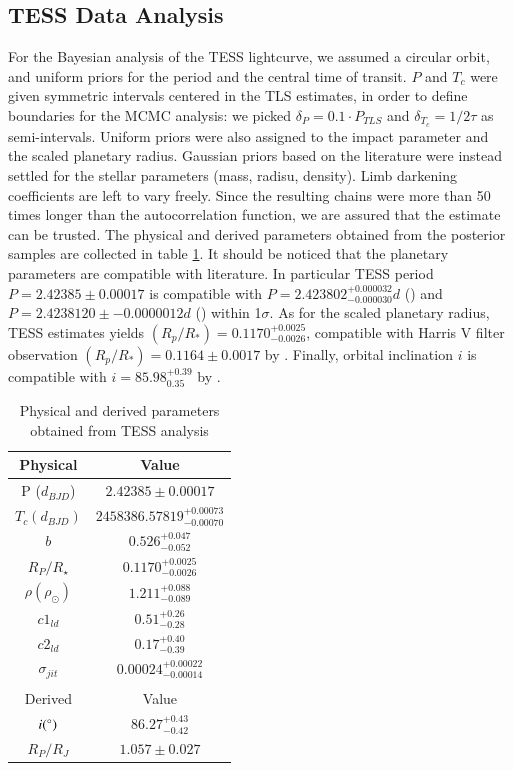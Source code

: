 \documentclass{aa}
\begin{document}
\subsection{TESS Data Analysis}
For the Bayesian analysis of the TESS lightcurve, we assumed a circular 
orbit, and uniform priors for the period and the central time of transit. $P$ and $T_c$ were given symmetric intervals centered in the TLS estimates, in order to define boundaries for the MCMC analysis: we picked $\delta_P=0.1\cdot P_{TLS}$ and $\delta_{T_c}=1/2\tau$ as semi-intervals. Uniform priors were also assigned to the impact parameter and the scaled planetary radius. Gaussian priors based on the literature were instead settled for the stellar parameters (mass, radisu, density). Limb darkening coefficients are left to vary freely. Since the resulting chains were more than 50 times longer than the 
autocorrelation function, we are assured that the estimate can be trusted.
The physical and derived parameters obtained from the posterior samples are collected in table \ref{table:1}. It should be noticed that the planetary parameters are compatible with literature. In particular TESS period $P=2.42385\pm0.00017$ is compatible with  $P=2.423802^{+0.000032}_{-0.000030} d$ (\cite{Addison}) and $P=2.4238120\pm-0.0000012 d$ (\cite{Turner}) within 1$\sigma$. As for the scaled planetary radius, TESS estimates yields $(R_p/R_{*}) = 0.1170_{-0.0026}^{+0.0025}$, compatible with Harris V filter observation $(R_p/R_{*})=0.1164\pm0.0017$ by \cite{Turner}. Finally, orbital inclination $i$ is compatible with $i=85.98_{0.35}^{+0.39}$ by \cite{Addison}.
 \begin{table}[h!]
 \small
 \centering
    \begin{tabular}{cc}
    \hline
    Physical & Value \\
    \hline
    P ($d_{BJD}$)   &  $2.42385\pm0.00017$ \\
    $T_{c} (d_{BJD})$ &  $2458386.57819 _{-0.00070}^{+0.00073}$ \\ 
    $b$ & $0.526_{-0.052}^{+0.047}$ \\
    $R_{P }/ R_{\star}$&  $0.1170_{-0.0026}^{+0.0025}$\\
    $\rho (\rho_{\odot})$ & $1.211_{-0.089}^{+0.088}$\\
    $c1_{ld}$ & $0.51_{-0.28}^{+0.26}$ \\
    $c2_{ld}$ & $0.17_{-0.39}^{+0.40}$\\
    $\sigma_{jit}$ & $0.00024_{-0.00014}^{+0.00022}$ \\
    \hline
    \\
    \hline
    Derived & Value \\
    \hline
    $i (\degree)$ & $86.27^{+0.43}_{-0.42}$ \\
    $R_P/R_J$ &   $1.057\pm0.027$\\
    \hline
    \end{tabular} 
  \caption{Physical and derived parameters obtained from TESS analysis}
 \label{table:1}
 \end{table}
\end{document}
